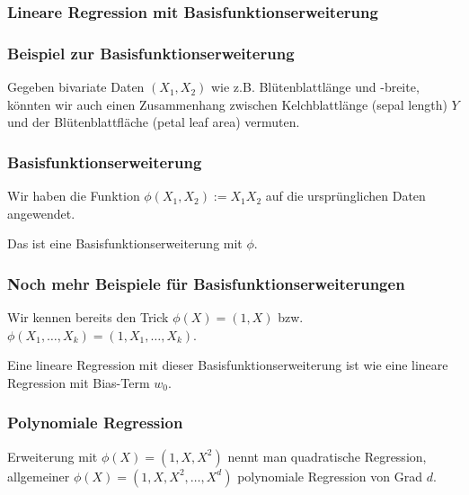 \begin{frame}[separator]
  \frametitle{Lineare Regression mit Basisfunktionserweiterung}
\end{frame}

\begin{frame}
\frametitle{Beispiel zur Basisfunktionserweiterung}
Gegeben bivariate Daten $(X_1,X_2)$ wie z.B. Blütenblattlänge und -breite,
könnten wir auch einen Zusammenhang zwischen Kelchblattlänge (sepal length) $Y$ und der Blütenblattfläche (petal leaf area) vermuten.

\end{frame}

\begin{frame}
\frametitle{Basisfunktionserweiterung}
Wir haben die Funktion $\phi(X_1,X_2) := X_1 X_2$ auf die ursprünglichen Daten angewendet.

Das ist eine \alert{Basisfunktionserweiterung} mit $\phi$.

\end{frame}

\begin{frame}
  \frametitle{Noch mehr Beispiele für Basisfunktionserweiterungen}

  Wir kennen bereits den Trick $\phi(X) = (1,X)$ bzw. $\phi(X_1,\dots,X_k) = (1,X_1,\dots,X_k)$.
  
  Eine lineare Regression mit dieser Basisfunktionserweiterung ist wie eine lineare Regression mit Bias-Term $w_0$.
\end{frame}

\begin{frame}
\frametitle{Polynomiale Regression}
Erweiterung mit $\phi(X) = (1,X,X^2)$ nennt man \alert{quadratische Regression},
allgemeiner $\phi(X) = (1,X,X^2,\dots,X^d)$ \alert{polynomiale Regression} von Grad $d$.

\end{frame}



